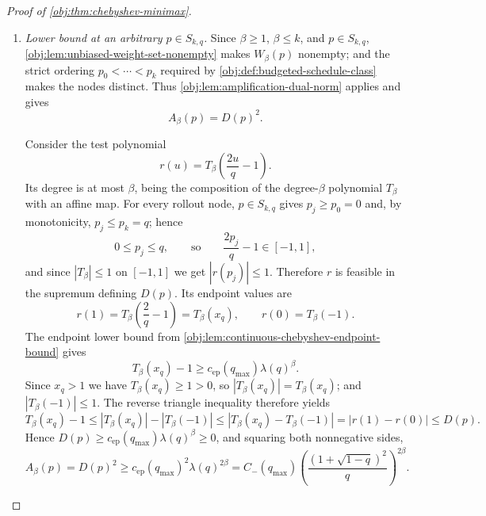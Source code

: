 \begin{proof}[Proof of \cref{obj:thm:chebyshev-minimax}]
\begin{enumerate}
\item \emph{Lower bound at an arbitrary \(p\in S_{k,q}\).}
Since \(\beta\ge1\), \(\beta\le k\), and \(p\in S_{k,q}\), \cref{obj:lem:unbiased-weight-set-nonempty}
makes \(W_\beta(p)\) nonempty; and the strict ordering \(p_0<\cdots<p_k\) required by
\cref{obj:def:budgeted-schedule-class} makes the nodes distinct. Thus
\cref{obj:lem:amplification-dual-norm} applies and gives
\[
A_\beta(p)=D(p)^2 .
\]

Consider the test polynomial
\[
r(u)=T_\beta\!\left(\frac{2u}{q}-1\right).
\]
Its degree is at most \(\beta\), being the composition of the degree-\(\beta\) polynomial \(T_\beta\) with an affine map. %
For every rollout node, \(p\in S_{k,q}\) gives \(p_j\ge p_0=0\) and, by monotonicity, \(p_j\le p_k=q\); hence
\[
0\le p_j\le q,
\qquad\text{so}\qquad
\frac{2p_j}{q}-1\in[-1,1],
\]
and since \(|T_\beta|\le1\) on \([-1,1]\) we get \(|r(p_j)|\le1\). %
Therefore \(r\) is feasible in the supremum defining \(D(p)\). Its endpoint values are
\[
r(1)=T_\beta\!\left(\frac2q-1\right)=T_\beta(x_q),
\qquad
r(0)=T_\beta(-1).
\]
The endpoint lower bound from \cref{obj:lem:continuous-chebyshev-endpoint-bound} gives
\[
T_\beta(x_q)-1\ge c_{\mathrm{ep}}(q_{\max})\lambda(q)^\beta .
\]
Since \(x_q>1\) we have \(T_\beta(x_q)\ge1>0\), so \(|T_\beta(x_q)|=T_\beta(x_q)\); and \(|T_\beta(-1)|\le1\). The reverse triangle inequality therefore yields
\[
T_\beta(x_q)-1
\le
|T_\beta(x_q)|-|T_\beta(-1)|
\le |T_\beta(x_q)-T_\beta(-1)|
=|r(1)-r(0)|
\le D(p).
\]
Hence \(D(p)\ge c_{\mathrm{ep}}(q_{\max})\lambda(q)^\beta\ge0\), and squaring both nonnegative sides,
\[
A_\beta(p)=D(p)^2\ge c_{\mathrm{ep}}(q_{\max})^2\lambda(q)^{2\beta}
=
C_-(q_{\max})
\left(\frac{(1+\sqrt{1-q})^2}{q}\right)^{2\beta}.
\]


\end{enumerate}
\end{proof}
